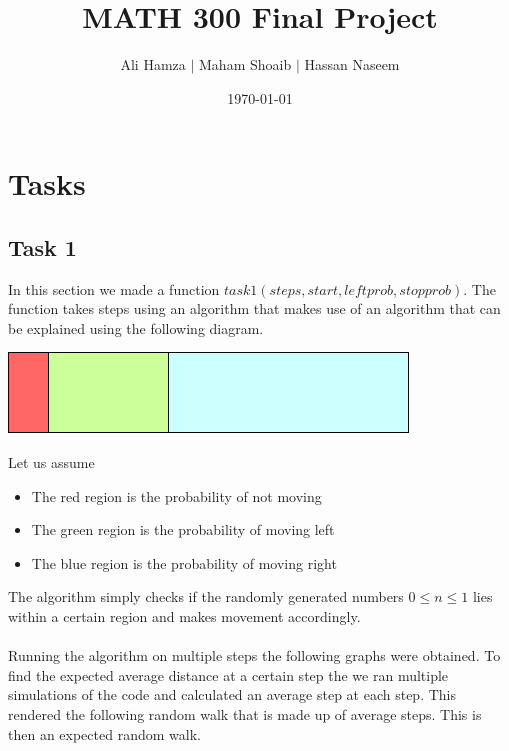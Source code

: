 \documentclass{article}
\title{\textbf{MATH 300 Final Project}}
\author{Ali Hamza $|$ Maham Shoaib $|$ Hassan Naseem}
\date{\today}
\begin{document}
\maketitle

\section{Tasks}
\subsection{Task 1}
In this section we made a function $task1(steps,start,leftprob,stopprob)$. The function takes steps using an algorithm that makes use
of an algorithm that can be explained using the following diagram.
\begin{center}
    \includegraphics{task1prob.png}
\end{center}
Let us assume
\begin{itemize}
    \item The red region is the probability of not moving
    \item The green region is the probability of moving left
    \item The blue region is the probability of moving right
\end{itemize}
The algorithm simply checks if the randomly generated numbers $0\leq n \leq 1$ lies within a certain 
region and makes movement accordingly.\\\\
Running the algorithm on multiple steps the following graphs were obtained.
To find the expected average distance at a certain step the we ran multiple simulations of the code and calculated an average step at each step. This rendered
the following random walk that is made up of average steps. This is then an expected
random walk. 
\end{document}
